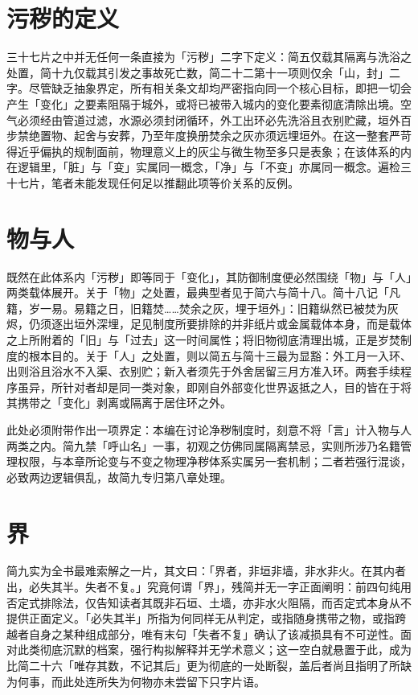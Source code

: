 \section{污秽的定义}

三十七片之中并无任何一条直接为「污秽」二字下定义：简五仅载其隔离与洗浴之处置，简十九仅载其引发之事故死亡数，简二十二第十一项则仅余「山，封」二字。尽管缺乏抽象界定，所有相关条文却均严密指向同一个核心目标，即把一切会产生「变化」之要素阻隔于城外，或将已被带入城内的变化要素彻底清除出境。空气必须经由管道过滤，水源必须封闭循环，外工出环必先洗浴且衣别贮藏，垣外百步禁绝置物、起舍与安葬，乃至年度换册焚余之灰亦须远埋垣外。在这一整套严苛得近乎偏执的规制面前，物理意义上的灰尘与微生物至多只是表象；在该体系的内在逻辑里，「脏」与「变」实属同一概念，「净」与「不变」亦属同一概念。遍检三十七片，笔者未能发现任何足以推翻此项等价关系的反例。

\section{物与人}

既然在此体系内「污秽」即等同于「变化」，其防御制度便必然围绕「物」与「人」两类载体展开。关于「物」之处置，最典型者见于简六与简十八。简十八记「凡籍，岁一易。易籍之日，旧籍焚……焚余之灰，埋于垣外」：旧籍纵然已被焚为灰烬，仍须逐出垣外深埋，足见制度所要排除的并非纸片或金属载体本身，而是载体之上所附着的「旧」与「过去」这一时间属性；将旧物彻底清理出城，正是岁焚制度的根本目的。关于「人」之处置，则以简五与简十三最为显豁：外工月一入环、出则浴且浴水不入渠、衣别贮；新入者须先于外舍居留三月方准入环。两套手续程序虽异，所针对者却是同一类对象，即刚自外部变化世界返抵之人，目的皆在于将其携带之「变化」剥离或隔离于居住环之外。

此处必须附带作出一项界定：本编在讨论净秽制度时，刻意不将「言」计入物与人两类之内。简九禁「呼山名」一事，初观之仿佛同属隔离禁忌，实则所涉乃名籍管理权限，与本章所论变与不变之物理净秽体系实属另一套机制；二者若强行混谈，必致两边逻辑俱乱，故简九专归第八章处理。

\section{界}

简九实为全书最难索解之一片，其文曰：「界者，非垣非墙，非水非火。在其内者出，必失其半。失者不复。」究竟何谓「界」，残简并无一字正面阐明：前四句纯用否定式排除法，仅告知读者其既非石垣、土墙，亦非水火阻隔，而否定式本身从不提供正面定义。「必失其半」所指为何同样无从判定，或指随身携带之物，或指跨越者自身之某种组成部分，唯有末句「失者不复」确认了该减损具有不可逆性。面对此类彻底沉默的档案，强行构拟解释并无学术意义；这一空白就悬置于此，成为比简二十六「唯存其数，不记其后」更为彻底的一处断裂，盖后者尚且指明了所缺为何事，而此处连所失为何物亦未尝留下只字片语。

